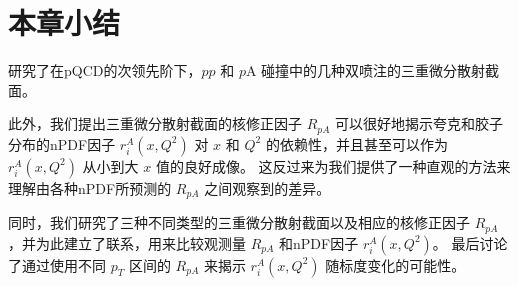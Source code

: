 \section{本章小结}

	研究了在pQCD的次领先阶下，$pp$ 和 $p$A 碰撞中的几种双喷注的三重微分散射截面。
	
	
	此外，我们提出三重微分散射截面的核修正因子 $R_{pA}$ 可以很好地揭示夸克和胶子分布的nPDF因子 $r^A_i(x,Q^2)$ 对 $x$ 和 $Q^2$ 的依赖性，并且甚至可以作为 $r^A_i(x,Q^2)$ 从小到大 $x$ 值的良好成像。
	这反过来为我们提供了一种直观的方法来理解由各种nPDF所预测的 $R_{pA}$ 之间观察到的差异。
	
	
同时，我们研究了三种不同类型的三重微分散射截面以及相应的核修正因子 $R_{pA}$，并为此建立了联系，用来比较观测量 $R_{pA}$ 和nPDF因子 $r^A_i(x,Q^2)$。
最后讨论了通过使用不同 $p_T$ 区间的 $R_{pA}$ 来揭示 $r^A_i(x,Q^2)$ 随标度变化的可能性。

